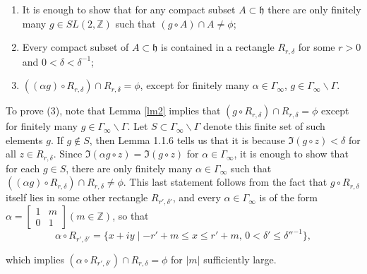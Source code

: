 \documentclass[12pt]{article} %
\begin{document}
\begin{enumerate}
  \item It is enough to show that for any compact subset $A \subset \mathfrak{h}$ there are only finitely many $g \in SL(2, \mathbb{Z})$ such that $(g \circ A) \cap A \neq \phi$;

  \item Every compact subset of $A \subset \mathfrak{h}$ is contained in a rectangle $R_{r,\delta}$ for some $r > 0$ and $0 < \delta < \delta^{-1}$;

  \item $((\alpha g) \circ R_{r,\delta}) \cap R_{r,\delta} = \phi$, except for finitely many $\alpha \in \Gamma_{\infty}$, $g \in \Gamma_{\infty}\backslash \Gamma$.
\end{enumerate}

To prove (3), note that Lemma \ref{lm2} implies that $(g \circ R_{r,\delta}) \cap R_{r,\delta} = \phi$ except for finitely many $g \in \Gamma_{\infty}\backslash \Gamma$. Let $S \subset \Gamma_{\infty}\backslash \Gamma$ denote this finite set of such elements $g$. If $g \not\in S$, then Lemma 1.1.6 tells us that it is because $\Im(g \circ z) < \delta$ for all $z \in R_{r,\delta}$. Since $\Im(\alpha g \circ z) = \Im(g \circ z)$ for $\alpha \in \Gamma_{\infty}$, it is enough to show that for each $g \in S$, there are only finitely many $\alpha \in \Gamma_{\infty}$ such that $((\alpha g) \circ R_{r,\delta}) \cap R_{r,\delta} \neq \phi$. This last statement follows from the fact that $g \circ R_{r,\delta}$ itself lies in some other rectangle $R_{r',\delta'}$, and every $\alpha \in \Gamma_{\infty}$ is of the form $\alpha =
  \begin{bmatrix}
    1 & m \\
    0 & 1
  \end{bmatrix}
  (m \in \mathbb{Z})$, so that
\[
  \alpha \circ R_{r',\delta'} = \{x + iy \mid -r' + m \leq x \leq r' + m, \, 0 < \delta' \leq \delta''^{-1}\},
\]

which implies $(\alpha \circ R_{r',\delta'}) \cap R_{r,\delta} = \phi$ for $|m|$ sufficiently large.
\end{document}
